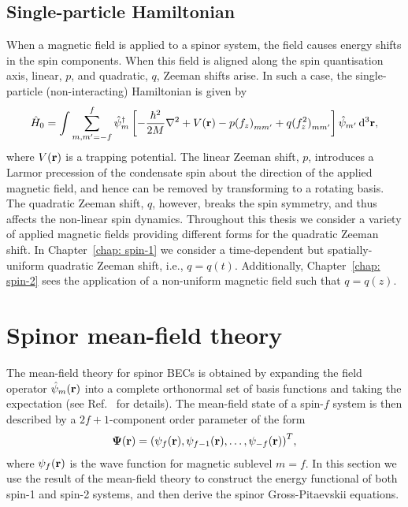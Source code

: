 \subsection{Single-particle Hamiltonian}
When a magnetic field is applied to a spinor system, the field causes energy
shifts in the spin components.
When this field is aligned along the spin quantisation axis, linear, \(p\), and
quadratic, \(q\), Zeeman shifts arise.
In such a case, the single-particle (non-interacting) Hamiltonian is given
by~\cite{Kawaguchi2012}
\begin{equation}\label{eq: single-particle-Hamiltonian}
    \hat{H}_0 = \int \sum_{m,m'=-f}^{f} \hat{\psi}_m^\dagger \left[
        -\frac{\hbar^2}{2M}\nabla^2 + V(\vb{r})
        - p{(f_z)}_{mm'} + q{(f_z^2)}_{mm'}\right]\hat{\psi}_{m'} \,\dd^3\vb{r},
\end{equation}
where \(V(\vb{r})\) is a trapping potential.
The linear Zeeman shift, \(p\), introduces a Larmor precession of the condensate
spin about the direction of the applied magnetic field, and hence can be
removed by transforming to a rotating basis.
The quadratic Zeeman shift, \(q\), however, breaks the spin symmetry, and thus
affects the non-linear spin dynamics.
Throughout this thesis we consider a variety of applied magnetic fields
providing different forms for the quadratic Zeeman shift.
In Chapter~\ref{chap: spin-1} we consider a time-dependent but spatially-uniform
quadratic Zeeman shift, i.e., \(q = q(t)\).
Additionally, Chapter~\ref{chap: spin-2} sees the application of a non-uniform
magnetic field such that \(q=q(z)\).

\section{Spinor mean-field theory}
The mean-field theory for spinor BECs is obtained by expanding the field
operator \(\hat{\psi}_m(\vb{r})\) into a complete orthonormal set of basis
functions and taking the expectation (see Ref.~\cite{Kawaguchi2012} for
details).
The mean-field state of a spin-\(f\) system is then described by a
\(2f+1\)-component order parameter of the form
\begin{align}
    \vb{\Psi}(\vb{r}) = {\left(\psi_f(\vb{r}), \psi_{f-1}(\vb{r}), \ldots,
        \psi_{-f}(\vb{r})\right)}^T,
\end{align}
where \(\psi_f(\vb{r})\) is the wave function for magnetic sublevel \(m=f\).
In this section we use the result of the mean-field theory to construct the
energy functional of both spin-1 and spin-2 systems, and then derive the
spinor Gross-Pitaevskii equations.

